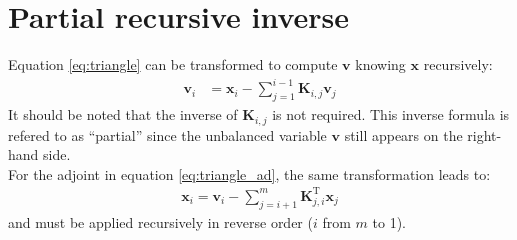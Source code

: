 \documentclass[12pt]{scrartcl}
\begin{document}
\section{Partial recursive inverse}
Equation \eqref{eq:triangle} can be transformed to compute $\mathbf{v}$ knowing $\mathbf{x}$ recursively:
\begin{align}
\label{eq:partial_inverse}
\mathbf{v}_i  & = \mathbf{x}_i - \sum_{j=1}^{i-1} \mathbf{K}_{i,j} \mathbf{v}_j
\end{align}
It should be noted that the inverse of $\mathbf{K}_{i,j}$ is not required. This inverse formula is refered to as ``partial'' since the unbalanced variable $\mathbf{v}$ still appears on the right-hand side.\\
$  $\\
For the adjoint in equation \eqref{eq:triangle_ad}, the same transformation leads to:
\begin{align}
\label{eq:partial_inverse_ad}
\mathbf{x}_i = \mathbf{v}_i - \sum_{j=i+1}^{m} \mathbf{K}^\mathrm{T}_{j,i} \mathbf{x}_j
\end{align}
and must be applied recursively in reverse order ($i$ from $m$ to 1).
\end{document}
